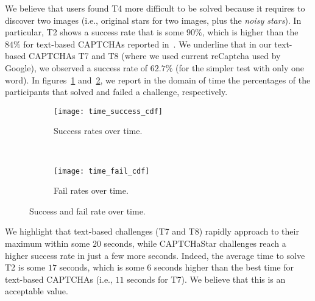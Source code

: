 \documentclass[conference]{IEEEtran}
\begin{document}
We believe that users found T4 more difficult to be solved because it requires to discover two images (i.e., original stars for two images, plus the \textit{noisy stars}).
In particular, T2 shows a success rate that is some $90\%$, which is higher than the $84\%$ for text-based CAPTCHAs reported in~\cite{bursztein2010good}.
We underline that in our text-based CAPTCHAs T7 and T8 (where we used current reCaptcha used by Google), we observed a success rate of $62.7\%$ (for the simpler test with only one word).
In figures~\ref{fig:cdf_time_success} and~\ref{fig:cdf_time_fail}, 
we report in the domain of time the percentages of the participants that solved and failed a challenge, respectively. 

\begin{comment}
\begin{figure}[h!]
\begin{subfigure}{.22\textwidth}
\texttt{[image: time\_success\_cdf2]}
\caption{Success rates over time.}
\label{fig:cdf_time_success}
\end{subfigure}
\hspace{0.1cm}
\begin{subfigure}{.22\textwidth}
\texttt{[image: time\_fail\_cdf2]}
\caption{Fail rates over time.}
\label{fig:cdf_time_fail}
\end{subfigure}
\vspace{-0.25cm}
\caption{Success and fail rate over time. }
\label{fig:time_cdf}
\end{figure}
\end{comment}
\begin{figure}[t!]
\centering
\begin{subfigure}{.48\textwidth}
\texttt{[image: time\_success\_cdf]}
\caption{Success rates over time.}
\label{fig:cdf_time_success}
\end{subfigure}
\\
\vspace{0.5cm}
\begin{subfigure}{.48\textwidth}
\texttt{[image: time\_fail\_cdf]}
\caption{Fail rates over time.}
\label{fig:cdf_time_fail}
\end{subfigure}
\caption{Success and fail rate over time. }
\label{fig:time_cdf}
\end{figure}
We highlight that text-based challenges (T7 and T8) rapidly approach to their maximum within some $20$ seconds, while CAPTCHaStar challenges reach a higher success rate in just a few more seconds. 
Indeed, the average time to solve T2 is some $17$ seconds, which is some $6$ seconds higher than the best time for text-based CAPTCHAs (i.e., $11$ seconds for T7).
We believe that this is an acceptable value.
\end{document}
